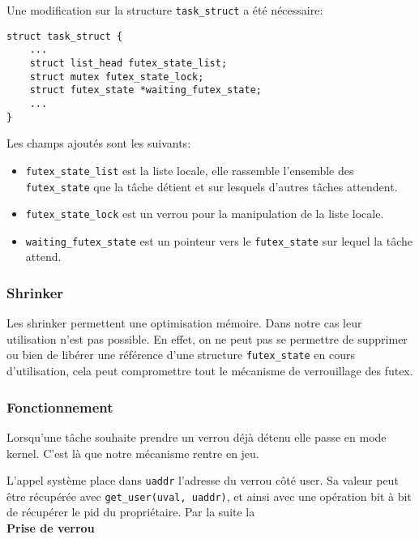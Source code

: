 Une modification sur la structure \verb|task_struct| a été nécessaire:

\begin{lstlisting}
struct task_struct {
	...
	struct list_head futex_state_list;
	struct mutex futex_state_lock;
	struct futex_state *waiting_futex_state;
	...
}
\end{lstlisting}

Les champs ajoutés sont les suivants:
\begin{itemize}
	\item \verb|futex_state_list| est la liste locale, elle rassemble l'ensemble des
	\verb|futex_state| que la tâche détient et sur lesquels d'autres tâches attendent.
	
	\item \verb|futex_state_lock| est un verrou pour la manipulation de la liste locale.
	
	\item \verb|waiting_futex_state| est un pointeur vers le \verb|futex_state| sur lequel
	la tâche attend.
\end{itemize}

\subsubsection{Shrinker}

Les shrinker permettent une optimisation mémoire.
Dans notre cas leur utilisation n'est pas possible. En effet, on ne peut pas se permettre 
de supprimer ou bien de libérer une référence d'une structure \verb|futex_state| en cours 
d'utilisation, cela peut compromettre tout le mécanisme de verrouillage des futex.


\subsubsection{Fonctionnement}

Lorsqu'une tâche souhaite prendre un verrou déjà détenu elle passe en mode kernel. 
C'est là que notre mécanisme rentre en jeu.

L'appel système place dans \verb|uaddr| l'adresse du verrou côté user. 
Sa valeur peut être récupérée avec \verb|get_user(uval, uaddr)|,
et ainsi avec une opération bit à bit de récupérer le pid du propriétaire.
Par la suite la
\\

\noindent \textbf{Prise de verrou}



